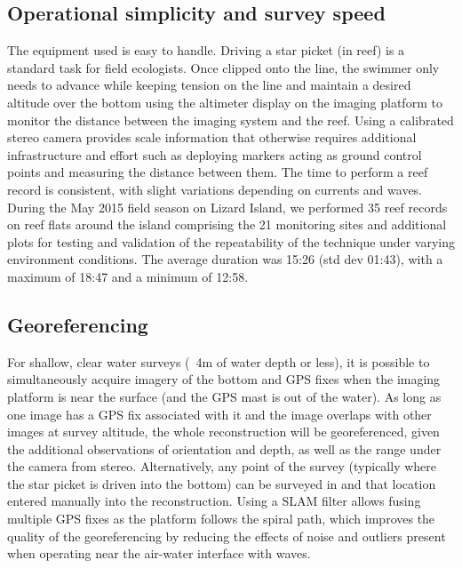 \subsection{Operational simplicity and survey speed}
The equipment used is easy to handle. Driving a star picket (in reef) is a standard task for field ecologists. Once clipped onto the line, the swimmer only needs to advance while keeping tension on the line and maintain a desired altitude over the bottom using the altimeter display on the imaging platform to monitor the distance between the imaging system and the reef.  
Using a calibrated stereo camera provides scale information that otherwise requires additional infrastructure and effort such as deploying markers acting as ground control points and measuring the distance between them. 
The time to perform a reef record is consistent, with slight variations depending on currents and waves. During the May 2015 field season on Lizard Island, we performed 35 reef records on reef flats around the island comprising the 21 monitoring sites and additional plots for testing and validation of the repeatability of the technique under varying environment conditions. The average duration was 15:26 (std dev 01:43), with a maximum of 18:47 and a minimum of 12:58. 





\subsection{Georeferencing}
For shallow, clear water surveys (~4m of water depth or less), it is possible to simultaneously acquire imagery of the bottom and GPS fixes when the imaging platform is near the surface (and the GPS mast is out of the water). As long as one image has a GPS fix associated with it and the image overlaps with other images at survey altitude, the whole reconstruction will be georeferenced, given the additional observations of orientation and depth, as well as the range under the camera from stereo. Alternatively, any point of the survey (typically where the star picket is driven into the bottom) can be surveyed in and that location entered manually into the reconstruction. Using a SLAM filter allows fusing multiple GPS fixes as the platform follows the spiral path, which improves the quality of the georeferencing by reducing the effects of noise and outliers present when operating near the air-water interface with waves.

